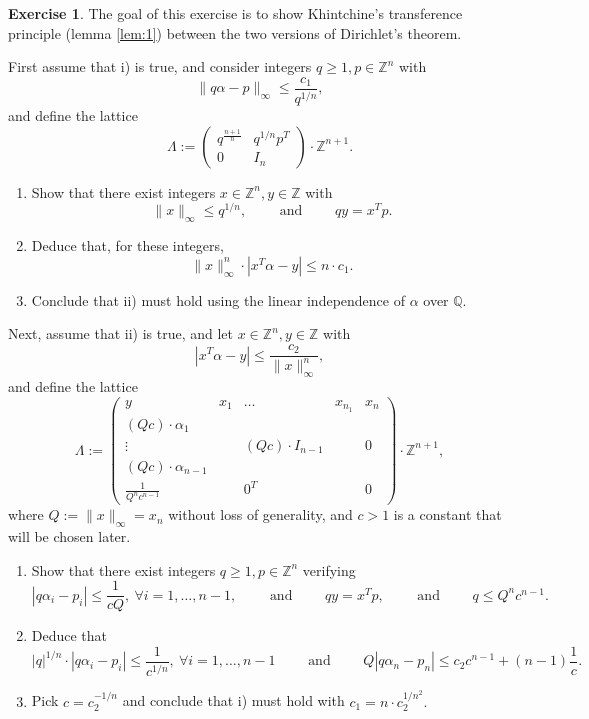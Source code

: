 \documentclass[12pt,a4paper]{article}
\theoremstyle{plain}
\newtheorem*{Sol*}{Solution}
\theoremstyle{definition}
\newtheorem{Ex}{Exercise}
\def \Q {\mathbb Q}
\def \Z {\mathbb Z}
\newif\ifsolutions
\newcommand{\exercise}[2]{
			\begin{Ex} #1 \end{Ex}
			\ifsolutions  \begin{Sol*} #2 \end{Sol*} \bigskip \else \bigskip  \fi
		}
\begin{document}
\exercise{
	The goal of this exercise is to show Khintchine's transference principle (lemma \ref{lem:1}) between the two versions of Dirichlet's theorem.

	First assume that i) is true, and consider integers $q \geq 1, p \in \Z^n$ with
		\[ \| q \alpha - p \|_\infty \leq \frac{c_1}{q^{1/n}}, \]
	and define the lattice 
		\[ \Lambda := \begin{pmatrix} q^{\frac{n+1}n} & q^{1/n} p^T \\ 0 & I_n \end{pmatrix} \cdot \Z^{n+1}.\]

	\begin{enumerate}
		\item Show that there exist integers $x \in \Z^n, y \in \Z$ with
			\[ \| x \|_\infty \leq q^{1/n}, \qquad \text{ and } \qquad qy = x^Tp.\]
		\item Deduce that, for these integers,
			\[  \| x \|_\infty^n \cdot | x^T \alpha - y | \leq n \cdot c_1. \]
		\item Conclude that ii) must hold using the linear independence of $\alpha$ over $\Q$.
	\end{enumerate}

	Next, assume that ii) is true, and let $x \in \Z^n, y \in \Z$ with
		\[ | x^T \alpha - y | \leq \frac{c_2}{ \| x \|_\infty^n}, \]
	and define the lattice 
		\[ \Lambda := \begin{pmatrix}
					y & x_1 & \dots & x_{n_1} & x_n \\
					(Qc)\cdot\alpha_1 & & & & \\
					\vdots & & (Qc) \cdot I_{n-1} & & 0 \\
					(Qc)\cdot\alpha_{n-1} & & & & \\
					 \frac{1}{Q^n c^{n-1}} & & 0^T & & 0 
					\end{pmatrix} \cdot \Z^{n+1},\]
	where $Q := \| x \|_\infty = x_n$ without loss of generality, and $c > 1$ is a constant that will be chosen later.

	\begin{enumerate}
		\item Show that there exist integers $q \geq 1, p \in \Z^n$ verifying
			\[ | q \alpha_i - p_i | \leq \frac{1}{cQ}, \ \forall i=1, \dots, n-1, \qquad \text{ and } \qquad qy = x^Tp, \qquad \text{ and } \qquad q \leq Q^n c^{n-1}. \]
		\item Deduce that 
			\[ |q|^{1/n} \cdot | q \alpha_i - p_i | \leq \frac{1}{c^{1/n}}, \ \forall i=1, \dots, n-1 \qquad \text{ and } \qquad Q | q \alpha_n - p_n| \leq c_2 c^{n-1} + (n-1)\frac1c.\]
		\item Pick $c = c_2^{-1/n}$ and conclude that i) must hold with $c_1 = n \cdot c_2^{1/n^2}.$
	\end{enumerate}
}
{}
\end{document}
